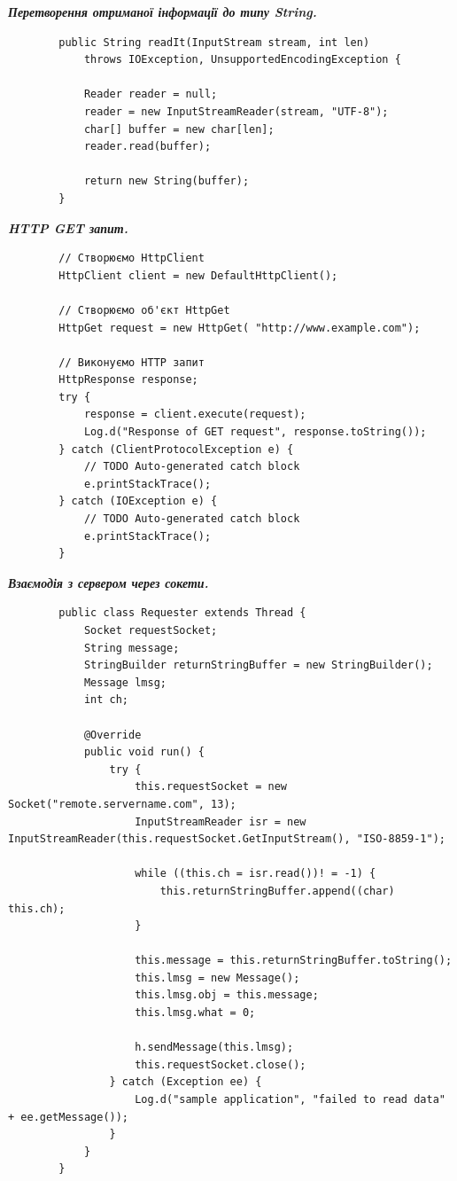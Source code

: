 \documentclass[14pt, a4paper]{extreport}
\begin{document}
	\textbf{\textit{Перетворення отриманої інформації до типу String.}}
	
	\begin{verbatim}
		public String readIt(InputStream stream, int len) 
			throws IOException, UnsupportedEncodingException {
			
			Reader reader = null;
			reader = new InputStreamReader(stream, "UTF-8");
			char[] buffer = new char[len];
			reader.read(buffer); 
			
			return new String(buffer);
		}
	\end{verbatim}
	
	\textbf{\textit{HTTP GET запит.}}
	
	\begin{verbatim}
		// Створюємо HttpClient
		HttpClient client = new DefaultHttpClient();
		
		// Створюємо об'єкт HttpGet
		HttpGet request = new HttpGet( "http://www.example.com");
		
		// Виконуємо HTTP запит
		HttpResponse response;
		try {
			response = client.execute(request);
			Log.d("Response of GET request", response.toString());
		} catch (ClientProtocolException e) {
			// TODO Auto-generated catch block
			e.printStackTrace();
		} catch (IOException e) {
			// TODO Auto-generated catch block
			e.printStackTrace();
		}
	\end{verbatim}
	
	\textbf{\textit{Взаємодія з сервером через сокети.}}
	
	\begin{verbatim}
		public class Requester extends Thread {
			Socket requestSocket;
			String message;
			StringBuilder returnStringBuffer = new StringBuilder();
			Message lmsg;
			int ch;
			
			@Override 
			public void run() {
				try {
					this.requestSocket = new Socket("remote.servername.com", 13);
					InputStreamReader isr = new InputStreamReader(this.requestSocket.GetInputStream(), "ISO-8859-1");
					
					while ((this.ch = isr.read())! = -1) {
						this.returnStringBuffer.append((char) this.ch);
					}
					
					this.message = this.returnStringBuffer.toString();
					this.lmsg = new Message();
					this.lmsg.obj = this.message; 
					this.lmsg.what = 0;
					
					h.sendMessage(this.lmsg);
					this.requestSocket.close();
				} catch (Exception ee) {
					Log.d("sample application", "failed to read data" + ee.getMessage());
				}
			}
		}
	\end{verbatim}
	
\end{document}
